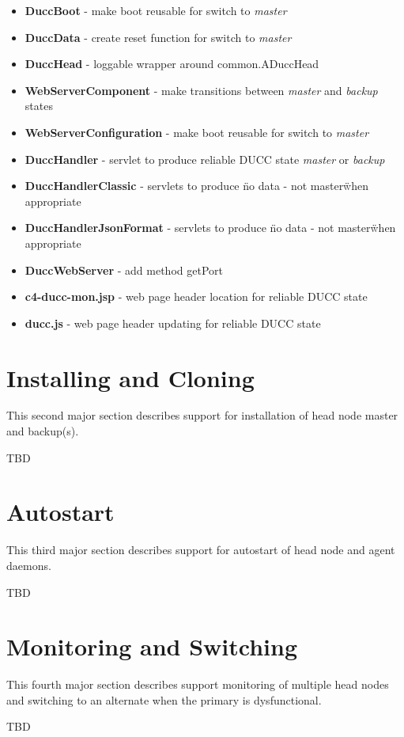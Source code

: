 \documentclass[letterpaper]{article}
\begin{document}
{\renewcommand\labelitemi{}
\begin{itemize}
  \item \textbf{DuccBoot} - make boot reusable for switch to {\em master}
  \item \textbf{DuccData} - create reset function for switch to {\em master}
  \item \textbf{DuccHead} - loggable wrapper around common.ADuccHead
  \item \textbf{WebServerComponent} - make transitions between {\em master} and {\em backup} states
  \item \textbf{WebServerConfiguration} - make boot reusable for switch to {\em master}
  \item \textbf{DuccHandler} - servlet to produce reliable DUCC state {\em master} or {\em backup}
  \item \textbf{DuccHandlerClassic} - servlets to produce \"no data - not master\" when appropriate
  \item \textbf{DuccHandlerJsonFormat} - servlets to produce \"no data - not master\" when appropriate
  \item \textbf{DuccWebServer} - add method getPort
  \item \textbf{c4-ducc-mon.jsp} - web page header location for reliable DUCC state
  \item \textbf{ducc.js} - web page header updating for reliable DUCC state
\end{itemize}
}

\section{Installing and Cloning}

This second major section describes support for installation of head node master and backup(s).

TBD

\section{Autostart}

This third major section describes support for autostart of head node and agent daemons.

TBD

\section{Monitoring and Switching}

This fourth major section describes support monitoring of multiple head nodes and switching to an alternate when the primary is dysfunctional.

TBD
\end{document}

